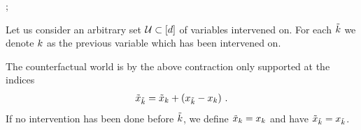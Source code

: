 \begin{example}
{\begin{scope}[shift={(17.5,0)}]
\begin{scope}[shift={(0,4)}]
            \end{scope}

            \begin{scope}[shift={(10,0)}]


            \end{scope}


        \end{scope}


        \begin{scope}[shift={(26.5,2)}]
            ;
        \end{scope}
    }

    Let us consider an arbitrary set $\mathcal{U}\subset[d]$ of variables intervened on.
    For each $\tilde{k}$ we denote $k$ as the previous variable which has been intervened on.

    The counterfactual world is by the above contraction only supported at the indices
    \begin{align*}
        \tilde{x}_{\tilde{k}}
        = \tilde{x}_{k} + \left(x_{\tilde{k}} - x_{k}\right) \, .
    \end{align*}
    If no intervention has been done before $\tilde{k}$, we define $\tilde{x}_{k}=x_{k}$ and have $\tilde{x}_{\tilde{k}}=x_{\tilde{k}}$.


\end{example}
